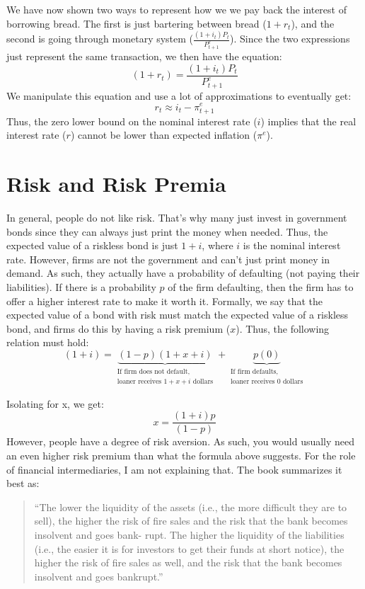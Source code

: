 \documentclass{extarticle}
\begin{document}
We have now shown two ways to represent how we we pay back the interest of borrowing bread. The first is just bartering between bread ($1+r_t$), and the second is going through monetary system ($\frac{(1+i_t)P_t}{P^e_{t+1}}$). Since the two expressions just represent the same transaction, we then have the equation:
$$(1+r_t) = \frac{(1+i_t)P_t}{P^e_{t+1}}$$
We manipulate this equation and use a lot of approximations to eventually get:
$$r_t \approx i_t - \pi^e_{t+1}$$
Thus, the zero lower bound on the nominal interest rate ($i$) implies that the real interest rate ($r$) cannot be lower than expected inflation ($\pi^e$).
\section{Risk and Risk Premia}
In general, people do not like risk. That's why many just invest in government bonds since they can always just print the money when needed. Thus, the expected value of a riskless bond is just $1+i$, where $i$ is the nominal interest rate. However, firms are not the government and can't just print money in demand. As such, they actually have a probability of defaulting (not paying their liabilities). If there is a probability $p$ of the firm defaulting, then the firm has to offer a higher interest rate to make it worth it. Formally, we say that the expected value of a bond with risk must match the expected value of a riskless bond, and firms do this by having a risk premium ($x$). Thus, the following relation must hold:
$$
(1+i) =
\underbrace{(1-p)(1+x+i)}_{\substack{\text{If firm does not default,}\\ \text{loaner receives $1+x+i$ dollars}}}
+
\underbrace{p(0)}_{\substack{\text{If firm defaults,}\\ \text{loaner receives 0 dollars}}}
$$

Isolating for x, we get:
$$x = \frac{(1+i)p}{(1-p)}$$
However, people have a degree of risk aversion. As such, you would usually need an even higher risk premium than what the formula above suggests. For the role of financial intermediaries, I am not explaining that. The book summarizes it best as:
\begin{quote}
``The lower the liquidity of the assets (i.e., the more difficult they are to sell), the
higher the risk of fire sales and the risk that the bank becomes insolvent and goes bank-
rupt. The higher the liquidity of the liabilities (i.e., the easier it is for investors to get their
funds at short notice), the higher the risk of fire sales as well, and the risk that the bank
becomes insolvent and goes bankrupt.''
\end{quote}
\end{document}
